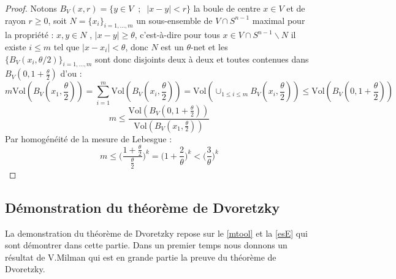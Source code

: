 \documentclass[12pt]{article}
\theoremstyle{definition}
\begin{document}
\begin{proof}
	Notons $B_V(x,r)=\big\{y\in V\; \; ; \; \; |x-y|< r\big\}$ la boule de centre $x\in V$ et de rayon $r\geq 0$, soit $N=\{x_i\}_{i=1,...,m}$ un sous-ensemble de $V\cap S^{n-1}$ maximal pour la propriété : $x,y\in N$ , $|x-y|\geq \theta$, c'est-à-dire pour tous $x\in V\cap S^{n-1}\backslash N$ il existe $i\leq m$ tel que $|x-x_i|<\theta$, donc $N$ est un $\theta$-net et les $\big\{B_V(x_i,\theta/2)\big\}_{i=1,...,m}$ sont donc disjoints deux à deux et toutes contenues dans $B_V(0,1+\frac{\theta}{2})$ d'ou : 
	\begin{equation*}
	m \text{Vol}(B_V(x_1,\frac{\theta}{2}))= \sum_{i=1}^{m}\text{Vol}(B_V(x_i,\frac{\theta}{2}))= \text{Vol}(\cup_{1\leq i \leq m} B_V(x_i,\frac{\theta}{2}))\leq \text{Vol}(B_V(0,1+\frac{\theta}{2}))
	\end{equation*}
	\begin{equation*}
	m\leq \frac{\text{Vol}(B_V(0,1+\frac{\theta}{2}))}{\text{Vol}(B_V(x_1,\frac{\theta}{2}))} 
	\end{equation*}
	Par homogénéité de la mesure de Lebesgue :
	\begin{equation*}
	m\leq\Bigg(\frac{1+\frac{\theta}{2}}{\frac{\theta}{2}}\Bigg)^k=  \Bigg(1+\frac{2}{\theta}\Bigg)^k<\big(\frac{3}{\theta}\big)^k
	\end{equation*}
\end{proof}

\subsection{Démonstration du théorème de Dvoretzky}
La demonstration du théorème de Dvoretzky repose sur le \cref{mtool} et la \cref{esE} qui sont démontrer dans cette partie. Dans un premier temps nous donnons un résultat de V.Milman qui est en grande partie la preuve du théorème de Dvoretzky.
\end{document}
